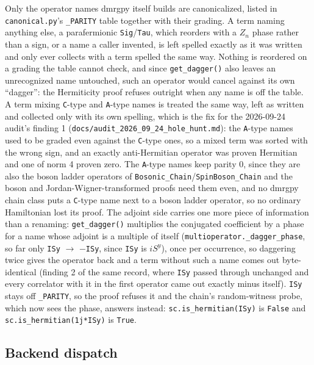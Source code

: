 \documentclass[11pt]{article}
\begin{document}
Only the operator names dmrgpy itself builds are canonicalized, listed
in \texttt{canonical.py}'s \texttt{\_PARITY} table together with their
grading. A term naming anything else, a parafermionic
\texttt{Sig}/\texttt{Tau}, which reorders with a $Z_n$ phase rather than
a sign, or a name a caller invented, is left spelled exactly as it was
written and only ever collects with a term spelled the same way.
Nothing is reordered on a grading the table cannot check, and since
\texttt{get\_dagger()} also leaves an unrecognized name untouched, such
an operator would cancel against its own ``dagger'': the Hermiticity
proof refuses outright when any name is off the table. A term mixing
\texttt{C}-type and \texttt{A}-type names is treated the same way, left
as written and collected only with its own spelling, which is the fix
for the 2026-09-24 audit's finding 1
(\texttt{docs/audit\_2026\_09\_24\_hole\_hunt.md}): the
\texttt{A}-type names used to be graded even against the
\texttt{C}-type ones, so a mixed term was sorted with the wrong sign,
and an exactly anti-Hermitian operator was proven Hermitian and one of
norm 4 proven zero. The \texttt{A}-type names keep parity 0, since they
are also the boson ladder operators of
\texttt{Bosonic\_Chain}/\texttt{SpinBoson\_Chain} and the boson and
Jordan-Wigner-transformed proofs need them even, and no dmrgpy chain
class puts a \texttt{C}-type name next to a boson ladder operator, so
no ordinary Hamiltonian lost its proof. The adjoint side carries one
more piece of information than a renaming: \texttt{get\_dagger()}
multiplies the conjugated coefficient by a phase for a name whose
adjoint is a multiple of itself (\texttt{multioperator.\_dagger\_phase},
so far only \texttt{ISy} $\to$ $-$\texttt{ISy}, since \texttt{ISy} is
$iS^y$), once per occurrence, so daggering twice gives the operator back
and a term without such a name comes out byte-identical (finding 2 of
the same record, where \texttt{ISy} passed through unchanged and every
correlator with it in the first operator came out exactly minus itself).
\texttt{ISy} stays off \texttt{\_PARITY}, so the proof refuses it and
the chain's random-witness probe, which now sees the phase, answers
instead: \texttt{sc.is\_hermitian(ISy)} is \texttt{False} and
\texttt{sc.is\_hermitian(1j*ISy)} is \texttt{True}.

\subsection{Backend dispatch}
\label{sec:dispatch}
\end{document}
